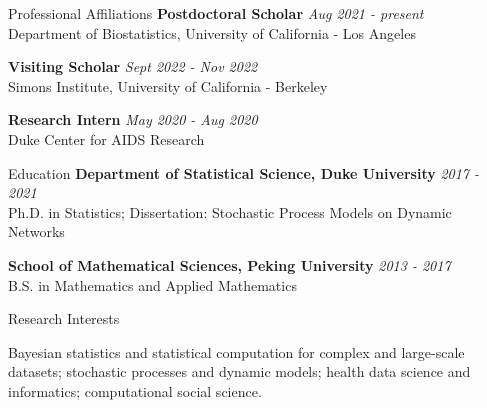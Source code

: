 \documentclass{resume} %
\begin{document}

\begin{rSection}{Professional Affiliations}
{\bf Postdoctoral Scholar} \hfill {\em Aug 2021 - present} 
\\ {\small Department of Biostatistics, University of California - Los Angeles}

{\bf Visiting Scholar} \hfill {\em Sept 2022 - Nov 2022} 
\\ {\small Simons Institute, University of California - Berkeley}


{\bf Research Intern} \hfill {\em May 2020 - Aug 2020} 
\\ { \small Duke Center for AIDS Research}
\end{rSection}

\begin{rSection}{Education}
{\bf Department of Statistical Science, Duke University} \hfill {\em 2017 - 2021} 
\\ Ph.D. in Statistics; Dissertation: Stochastic Process Models on Dynamic Networks

{\bf School of Mathematical Sciences, Peking University} \hfill {\em 2013 - 2017} 
\\ B.S. in Mathematics and Applied Mathematics
\end{rSection}

\begin{rSection}{Research Interests}

Bayesian statistics and statistical computation for complex and large-scale datasets; stochastic processes and dynamic models; health data science and informatics; computational social science. %

\end{rSection}




\end{document}

